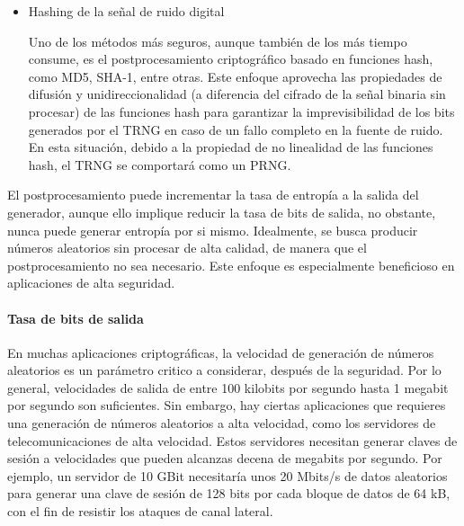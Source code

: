\begin{itemize}
                    
                    \item Hashing de la señal de ruido digital

                        Uno de los métodos más seguros, aunque también de los más tiempo consume, es el postprocesamiento criptográfico basado en funciones hash, como MD5, SHA-1, entre otras. Este enfoque aprovecha las propiedades de difusión y unidireccionalidad (a diferencia del cifrado de la señal binaria sin procesar) de las funciones hash para garantizar la imprevisibilidad de los bits generados por el TRNG en caso de un fallo completo en la fuente de ruido. En esta situación, debido a la propiedad de no linealidad de las funciones hash, el TRNG se comportará como un PRNG.
                    
                \end{itemize}
	
                El postprocesamiento puede incrementar la tasa de entropía a la salida del generador, aunque ello implique reducir la tasa de bits de salida, no obstante, nunca puede generar entropía por si mismo. Idealmente, se busca producir números aleatorios sin procesar de alta calidad, de manera que el postprocesamiento no sea necesario. Este enfoque es especialmente beneficioso en aplicaciones de alta seguridad.

	            \paragraph{Tasa de bits de salida\\}

                En muchas aplicaciones criptográficas, la velocidad de generación de números aleatorios es un parámetro critico a considerar, después de la seguridad. Por lo general, velocidades de salida de entre 100 kilobits por segundo hasta 1 megabit por segundo son suficientes. Sin embargo, hay ciertas aplicaciones que requieres una generación de números aleatorios a alta velocidad, como los servidores de telecomunicaciones de alta velocidad. Estos servidores necesitan generar claves de sesión a velocidades que pueden alcanzas decena de megabits por segundo. Por ejemplo, un servidor de 10 GBit necesitaría unos 20 Mbits/s de datos aleatorios para generar una clave de sesión de 128 bits por cada bloque de datos de 64 kB, con el fin de resistir los ataques de canal lateral.

